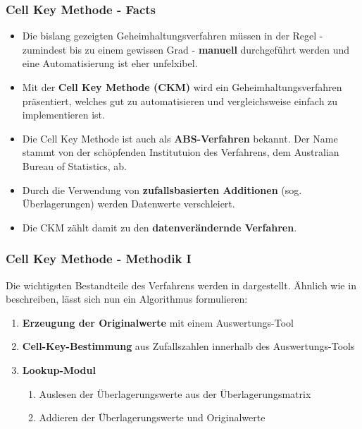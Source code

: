 \documentclass[aspectratio=169]{beamer}
\begin{document}
\begin{frame}{}
	\frametitle{Cell Key Methode - Facts}
    \begin{itemize}
        \item Die bislang gezeigten Geheimhaltungsverfahren müssen in der Regel - zumindest bis zu einem gewissen Grad - \textbf{manuell} durchgeführt werden und eine Automatisierung ist eher unfelxibel.
        \item Mit der \textbf{Cell Key Methode (CKM)} wird ein Geheimhaltungsverfahren präsentiert, welches gut zu automatisieren und vergleichsweise einfach zu implementieren ist.
        \item Die Cell Key Methode ist auch als \textbf{ABS-Verfahren} bekannt. Der Name stammt von der schöpfenden Institutuion des Verfahrens, dem Australian Bureau of Statistics, ab.
        \item Durch die Verwendung von \textbf{zufallsbasierten Additionen} (sog. Überlagerungen) werden Datenwerte verschleiert. 
        \item Die CKM zählt damit zu den \textbf{datenverändernde Verfahren}.
    \end{itemize}
\end{frame}


\begin{frame}{}
	\frametitle{Cell Key Methode - Methodik I}
    Die wichtigsten Bestandteile des Verfahrens werden in \cite{Enderle} dargestellt. Ähnlich wie in \cite{Wipke} beschreiben, lässt sich nun ein Algorithmus formulieren: 
    \newline
    \begin{enumerate}
        \item \textbf{Erzeugung der Originalwerte} mit einem Auswertungs-Tool
        \item \textbf{Cell-Key-Bestimmung} aus Zufallszahlen innerhalb des Auswertungs-Tools
        \item \textbf{Lookup-Modul}
        \begin{enumerate}
            \item Auslesen der Überlagerungswerte aus der Überlagerungsmatrix
            \item Addieren der Überlagerungswerte und Originalwerte
        \end{enumerate}
    \end{enumerate}
\end{frame}
\end{document}

